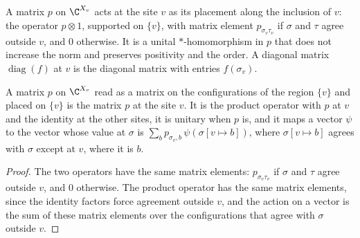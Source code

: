 \begin{definition}
    \label{def:sites_place_at}
    \leanok
    A matrix $p$ on $\C^{X_v}$ acts at the site $v$ as its placement along the inclusion of
    $v$: the operator $p\otimes1$, supported on $\{v\}$, with matrix element
    $p_{\sigma_v\tau_v}$ if $\sigma$ and $\tau$ agree outside $v$, and $0$ otherwise. It is a
    unital $*$-homomorphism in $p$ that does not increase the norm and preserves positivity
    and the order. A diagonal matrix $\operatorname{diag}(f)$ at $v$ is the diagonal matrix
    with entries $f(\sigma_v)$.
\end{definition}

\begin{lemma}
    \label{lem:sites_place_at_product}
    \leanok
    A matrix $p$ on $\C^{X_v}$ read as a matrix on the configurations of the region $\{v\}$
    and placed on $\{v\}$ is the matrix $p$ at the site $v$. It is the product operator with
    $p$ at $v$ and the identity at the other sites, it is unitary when $p$ is, and it maps a
    vector $\psi$ to the vector whose value at $\sigma$ is
    $\sum_bp_{\sigma_v,b}\,\psi(\sigma[v\mapsto b])$, where $\sigma[v\mapsto b]$ agrees with
    $\sigma$ except at $v$, where it is $b$.
\end{lemma}
\begin{proof}\leanok
    The two operators have the same matrix elements: $p_{\sigma_v\tau_v}$ if $\sigma$ and
    $\tau$ agree outside $v$, and $0$ otherwise. The product operator has the same matrix
    elements, since the identity factors force agreement outside $v$, and the action on a
    vector is the sum of these matrix elements over the configurations that agree with
    $\sigma$ outside $v$.
\end{proof}

